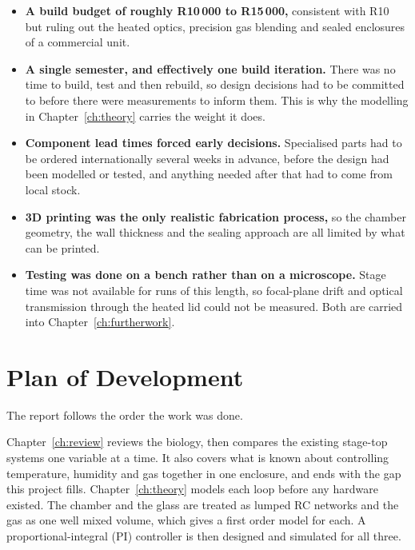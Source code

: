 \begin{itemize}[nosep]
    \item \textbf{A build budget of roughly R10\,000 to R15\,000,} consistent with R10 but ruling out the heated optics, precision gas blending and sealed enclosures of a commercial unit.
    \item \textbf{A single semester, and effectively one build iteration.} There was no time to build, test and then rebuild, so design decisions had to be committed to before there were measurements to inform them. This is why the modelling in Chapter~\ref{ch:theory} carries the weight it does.
    \item \textbf{Component lead times forced early decisions.} Specialised parts had to be ordered internationally several weeks in advance, before the design had been modelled or tested, and anything needed after that had to come from local stock.
    \item \textbf{3D printing was the only realistic fabrication process,} so the chamber geometry, the wall thickness and the sealing approach are all limited by what can be printed.
    \item \textbf{Testing was done on a bench rather than on a microscope.} Stage time was not available for runs of this length, so focal-plane drift and optical transmission through the heated lid could not be measured. Both are carried into Chapter~\ref{ch:furtherwork}.
\end{itemize}

\section{Plan of Development}
\label{sec:plan}

The report follows the order the work was done.

Chapter~\ref{ch:review} reviews the biology, then compares the existing stage-top systems one variable at a time. It also covers what is known about controlling temperature, humidity and gas together in one enclosure, and ends with the gap this project fills. Chapter~\ref{ch:theory} models each loop before any hardware existed. The chamber and the glass are treated as lumped RC networks and the gas as one well mixed volume, which gives a first order model for each. A proportional-integral (PI) controller is then designed and simulated for all three.

